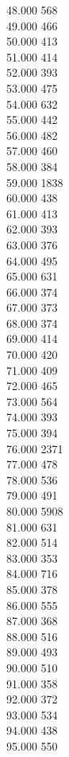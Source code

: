 { 48.000	568 \\
 49.000	466 \\
 50.000	413 \\
 51.000	414 \\
 52.000	393 \\
 53.000	475 \\
 54.000	632 \\
 55.000	442 \\
 56.000	482 \\
 57.000	460 \\
 58.000	384 \\
 59.000	1838 \\
 60.000	438 \\
 61.000	413 \\
 62.000	393 \\
 63.000	376 \\
 64.000	495 \\
 65.000	631 \\
 66.000	374 \\
 67.000	373 \\
 68.000	374 \\
 69.000	414 \\
 70.000	420 \\
 71.000	409 \\
 72.000	465 \\
 73.000	564 \\
 74.000	393 \\
 75.000	394 \\
 76.000	2371 \\
 77.000	478 \\
 78.000	536 \\
 79.000	491 \\
 80.000	5908 \\
 81.000	631 \\
 82.000	514 \\
 83.000	353 \\
 84.000	716 \\
 85.000	378 \\
 86.000	555 \\
 87.000	368 \\
 88.000	516 \\
 89.000	493 \\
 90.000	510 \\
 91.000	358 \\
 92.000	372 \\
 93.000	534 \\
 94.000	438 \\
 95.000	550 \\
}
